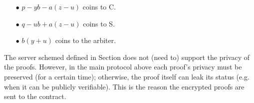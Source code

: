 \begin{enumerate}
\begin{enumerate}
\begin{itemize}
\item[$\bullet$]   $p-yb-a(z-u)$ coins  to C.
\item[$\bullet$] $q-ub+a(z-u)$ coins to S.
\item[$\bullet$] $b(y+u)$ coins to the arbiter.  
\end{itemize}

\end{enumerate}
\end{enumerate}


\begin{remark} The server schemed defined in  Section does not (need to) support the privacy of the proofs. However, in the main protocol above each proof's privacy must be preserved (for a certain time); otherwise, the proof itself can leak its status (e.g. when it can be publicly verifiable). This is the reason the encrypted proofs are sent to the contract.   

\end{remark}
















